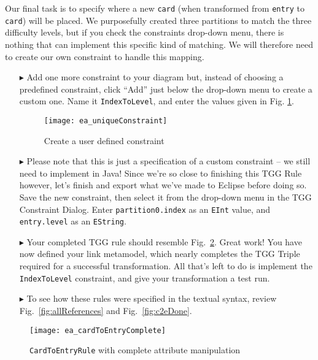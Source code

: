 Our final task is to specify where a new \texttt{card} (when transformed from \texttt{entry} to \texttt{card}) will be placed.  We purposefully created three
partitions to match the three difficulty levels, but if you check the constraints drop-down menu, there is nothing that can implement this specific kind of
matching. We will therefore need to create our own constraint to handle this mapping.

\begin{enumerate}

\item[$\blacktriangleright$] Add one more constraint to your diagram but, instead of choosing a predefined constraint, click ``Add'' just below the
drop-down menu to create a custom one. Name it \texttt{IndexToLevel}, and enter the values given in Fig. \ref{fig:create_new_constraint}.

\vspace{0.5cm}

\begin{figure}[htbp]
\begin{center}
  \texttt{[image: ea\_uniqueConstraint]}
  \caption{Create a user defined constraint \update}
  \label{fig:create_new_constraint}
\end{center}
\end{figure}
\FloatBarrier

\item[$\blacktriangleright$] Please note that this is just a specification of a custom constraint -- we still need to implement in Java! Since we're so close to
finishing this TGG Rule however, let's finish and export what we've made to Eclipse before doing so. Save the new constraint, then select it from the drop-down
menu in the TGG Constraint Dialog. Enter \texttt{partition0.index} as an \texttt{EInt} value, and \texttt{entry.level} as an \texttt{EString}.

\vspace{0.5cm}

\item[$\blacktriangleright$] Your completed TGG rule should resemble Fig.~\ref{fig:cardtoentry_complete}. Great work! You have now defined your link metamodel,
which nearly completes the TGG Triple required for a successful transformation. All that's left to do is implement the \texttt{IndexToLevel} constraint, and
give your transformation a test run.

\vspace{0.5cm}

\item[$\blacktriangleright$] To see how these rules were specified in the textual syntax, review Fig.~\ref{fig:allReferences} and Fig.~\ref{fig:c2eDone}.

\end{enumerate}

\newpage

\vspace*{3cm}

\begin{figure}[htbp]
\begin{center}
  \texttt{[image: ea\_cardToEntryComplete]}
  \caption{\texttt{CardToEntryRule} with complete attribute manipulation}
  \label{fig:cardtoentry_complete}
\end{center}
\end{figure}


